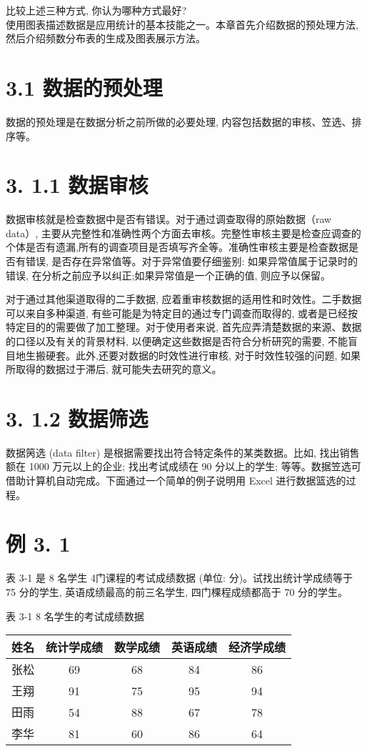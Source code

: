 \documentclass[10pt]{article}
\begin{document}
\begin{CJK*}{UTF8}{bsmi}
比较上述三种方式, 你认为哪种方式最好?\\
使用图表描述数据是应用统计的基本技能之一。本章首先介绍数据的预处理方法, 然后介绍频数分布表的生成及图表展示方法。

\section*{3.1 数据的预处理}
数据的预处理是在数据分析之前所做的必要处理, 内容包括数据的审核、笠选、排序等。

\section*{3. 1.1 数据审核}
数据审核就是检查数据中是否有错误。对于通过调查取得的原始数据（raw data）, 主要从完整性和准确性两个方面去审核。完整性审核主要是检查应调查的个体是否有遗漏,所有的调查项目是否填写齐全等。准确性审核主要是检查数据是否有错误, 是否存在异常值等。对于异常值要仔细鉴别: 如果异常值属于记录时的错误, 在分析之前应予以纠正;如果异常值是一个正确的值, 则应予以保留。

对于通过其他渠道取得的二手数据, 应着重审核数据的适用性和时效性。二手数据可以来自多种渠道, 有些可能是为特定目的通过专门调查而取得的, 或者是已经按特定目的的需要做了加工整理。对于使用者来说, 首先应弄清楚数据的来源、数据的口径以及有关的背景材料, 以便确定这些数据是否符合分析研究的需要, 不能盲目地生搬硬套。此外,还要对数据的时效性进行审核, 对于时效性较强的问题, 如果所取得的数据过于滞后, 就可能失去研究的意义。

\section*{3. 1.2 数据筛选}
数据䇤选 (data filter) 是根据需要找出符合特定条件的某类数据。比如, 找出销售额在 1000 万元以上的企业; 找出考试成绩在 90 分以上的学生; 等等。数据笠选可借助计算机自动完成。下面通过一个简单的例子说明用 Excel 进行数据篮选的过程。

\section*{例 3. 1}
表 3-1 是 8 名学生 4门课程的考试成绩数据 (单位: 分)。试找出统计学成绩等于 75 分的学生, 英语成绩最高的前三名学生, 四门棵程成绩都高于 70 分的学生。

表 3-1 8 名学生的考试成绩数据

\begin{center}
\begin{tabular}{ccccc}
\hline
姓名 & 统计学成绩 & 数学成绩 & 英语成绩 & 经济学成绩 \\
\hline
张松 & 69 & 68 & 84 & 86 \\
王翔 & 91 & 75 & 95 & 94 \\
田雨 & 54 & 88 & 67 & 78 \\
李华 & 81 & 60 & 86 & 64 \\
\hline
\end{tabular}
\end{center}


\end{CJK*}
\end{document}
